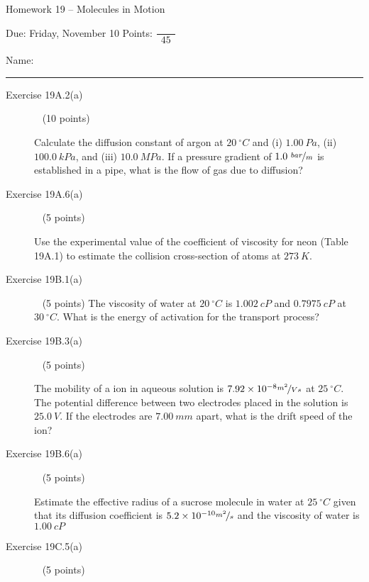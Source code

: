 \documentclass[12pt, openany, letterpaper]{memoir}
\begin{document}
\begin{center}
	{\large Homework 19 -- Molecules in Motion}
	
	Due: Friday, November 10 \hspace{3em} Points: ${\dfrac{~}{~~45~~}}$
\end{center}

Name: \rule[-.1mm]{15em}{0.1pt}

\begin{description}	
	\item [Exercise 19A.2(a)] ~ (10 points)
	
	Calculate the diffusion constant of argon at $20~^\circ C$ and (i) $1.00~Pa$, (ii) $100.0~kPa$, and (iii) $10.0~MPa$. If a pressure gradient of $1.0~\nicefrac{bar}{m}$ is established in a pipe, what is the flow of gas due to diffusion?
	
	
	\vspace{19em}
	\item [Exercise 19A.6(a)] ~ (5 points)
	
	Use the experimental value of the coefficient of viscosity for neon (Table 19A.1) to estimate the collision cross-section of  atoms at $273~K$.
	
	\vspace{20em}
	\item [Exercise 19B.1(a)] ~ (5 points)
	The viscosity of water at $20~^\circ C$ is $1.002~cP$ and $0.7975~cP$ at $30~^\circ C$. What is the energy of activation for the transport process?
	
	\vspace{23em}
	\item [Exercise 19B.3(a)] ~ (5 points)
	
	The mobility of a  ion in aqueous solution is $7.92\times10^{-8}\nicefrac{m^2}{Vs}$ at $25~^\circ C$. The potential difference between two electrodes placed in the solution is $25.0~V$. If the electrodes are $7.00~mm$ apart, what is the drift speed of the  ion?
	
	\vspace{23em}	
	\item [Exercise 19B.6(a)] ~ (5 points)
	
	Estimate the effective radius of a sucrose molecule in water at $25~^\circ C$ given that its diffusion coefficient is $5.2\times10^{-10}\nicefrac{m^2}{s}$ and the viscosity of water is $1.00~cP$
	
	\vspace{23em}	
	\item [Exercise 19C.5(a)] ~ (5 points)	
	

\end{description}
\end{document}
